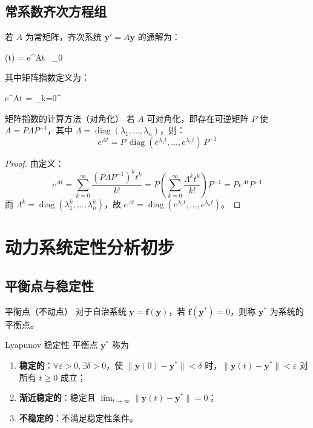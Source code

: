 \subsection{常系数齐次方程组}

若 $A$ 为常矩阵，齐次系统 $\mathbf{y}' = A\mathbf{y}$ 的通解为：
\begin{myformula}
	(t) = e^{At} \, _0
\end{myformula}

其中矩阵指数定义为：
\begin{myformula}
	e^{At} = \sum_{k=0}^{\infty} 
\end{myformula}

\begin{theorem}{矩阵指数的计算方法（对角化）}
	若 $A$ 可对角化，即存在可逆矩阵 $P$ 使 $A = P \Lambda P^{-1}$，其中 $\Lambda = \operatorname{diag}(\lambda_1, \ldots, \lambda_n)$，则：
	\[
	e^{At} = P \, \operatorname{diag}(e^{\lambda_1 t}, \ldots, e^{\lambda_n t}) \, P^{-1}
	\]
\end{theorem}

\begin{proof}
	由定义：
	\[
	e^{At} = \sum_{k=0}^{\infty} \frac{(P\Lambda P^{-1})^k t^k}{k!} = P \left( \sum_{k=0}^{\infty} \frac{\Lambda^k t^k}{k!} \right) P^{-1} = P e^{\Lambda t} P^{-1}
	\]
	而 $\Lambda^k = \operatorname{diag}(\lambda_1^k, \ldots, \lambda_n^k)$，故 $e^{\Lambda t} = \operatorname{diag}(e^{\lambda_1 t}, \ldots, e^{\lambda_n t})$。
\end{proof}

\section{动力系统定性分析初步}

\subsection{平衡点与稳定性}

\begin{mydefinition}{平衡点（不动点）}
	对于自治系统 $\dot{\mathbf{y}} = \mathbf{f}(\mathbf{y})$，若 $\mathbf{f}(\mathbf{y}^*) = 0$，则称 $\mathbf{y}^*$ 为系统的平衡点。
\end{mydefinition}

\begin{mydefinition}{Lyapunov 稳定性}
	平衡点 $\mathbf{y}^*$ 称为
	\begin{enumerate}
		\item \textbf{稳定的}：$\forall \varepsilon > 0, \exists \delta > 0$，使 $\|\mathbf{y}(0) - \mathbf{y}^*\| < \delta$ 时，$\|\mathbf{y}(t) - \mathbf{y}^*\| < \varepsilon$ 对所有 $t \ge 0$ 成立；
		\item \textbf{渐近稳定的}：稳定且 $\lim_{t\to\infty} \|\mathbf{y}(t) - \mathbf{y}^*\| = 0$；
		\item \textbf{不稳定的}：不满足稳定性条件。
	\end{enumerate}
\end{mydefinition}


